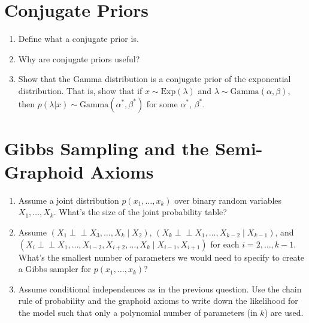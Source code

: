 \documentclass[11pt]{article}
\begin{document}
\section{Conjugate Priors}
\begin{enumerate}
\item Define what a conjugate prior is.\\
\begin{answertext}{3cm}{}  
\end{answertext} 

\item Why are conjugate priors useful? \\
\begin{answertext}{3cm}{}
\end{answertext} 

\item Show that the Gamma distribution is a conjugate prior of the exponential distribution. That is, show that if $x \sim \text{Exp}(\lambda)$ and $\lambda \sim \text{Gamma}(\alpha, \beta)$, then $p(\lambda | x) \sim \text{Gamma}(\alpha^*, \beta^*)$ for some $\alpha^*$, $\beta^*$. \\
\begin{answertext}{6cm}{}
\end{answertext} 
\end{enumerate}

\pagebreak
\section{Gibbs Sampling and the Semi-Graphoid Axioms}

\begin{enumerate}
\item Assume a joint distribution $p(x_1, \ldots, x_k)$ over binary random variables $X_1, \ldots, X_k$.
What's the size of the joint probability table?\\
\begin{answertext}{3cm}{}
\end{answertext}

\item Assume $(X_1 {\perp\!\!\!\perp} X_3, \ldots, X_k \mid X_2)$, $(X_k {\perp\!\!\!\perp} X_1, \ldots, X_{k-2} \mid X_{k-1})$, and $(X_i {\perp\!\!\!\perp} X_1, \ldots, X_{i-2}, X_{i+2}, \ldots, X_k \mid X_{i-1}, X_{i+1})$ for each $i = 2, \ldots, k-1$.  What's the smallest number of parameters we would need to specify to create a Gibbs sampler for $p(x_1, \ldots, x_k)$?\\
\begin{answertext}{6cm}{}
\end{answertext}

\item Assume conditional independences as in the previous question.  Use the chain rule of probability and the graphoid axioms to write down the likelihood for the model such that only a polynomial number of parameters (in $k$) are used.\\
\begin{answertext}{6cm}{}

\end{answertext} 
\end{enumerate}
\end{document}
